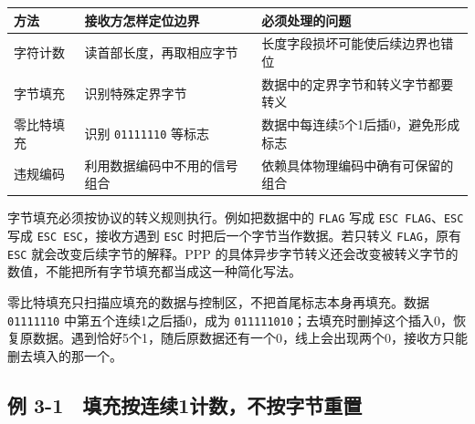 \begin{wideblock}

\par\medskip\noindent\begin{minipage}{\linewidth}\fontsize{9.3}{12}\selectfont\begin{tabularx}{\linewidth}{@{}YYY@{}}
\toprule\noalign{}
\begin{minipage}[b]{\linewidth}\raggedright
方法
\end{minipage} & \begin{minipage}[b]{\linewidth}\raggedright
接收方怎样定位边界
\end{minipage} & \begin{minipage}[b]{\linewidth}\raggedright
必须处理的问题
\end{minipage} \\
\midrule\noalign{}


字符计数 & 读首部长度，再取相应字节 & 长度字段损坏可能使后续边界也错位 \\
字节填充 & 识别特殊定界字节 & 数据中的定界字节和转义字节都要转义 \\
零比特填充 & 识别 \texttt{01111110} 等标志 & 数据中每连续5个1后插0，避免形成标志 \\
违规编码 & 利用数据编码中不用的信号组合 & 依赖具体物理编码中确有可保留的组合 \\
\bottomrule\end{tabularx}
\end{minipage}\par\medskip

\end{wideblock}

字节填充必须按协议的转义规则执行。例如把数据中的 \texttt{FLAG} 写成 \texttt{ESC FLAG}、\texttt{ESC} 写成 \texttt{ESC ESC}，接收方遇到 \texttt{ESC} 时把后一个字节当作数据。若只转义 \texttt{FLAG}，原有 \texttt{ESC} 就会改变后续字节的解释。PPP 的具体异步字节转义还会改变被转义字节的数值，不能把所有字节填充都当成这一种简化写法。

零比特填充只扫描应填充的数据与控制区，不把首尾标志本身再填充。数据 \texttt{01111110} 中第五个连续1之后插0，成为 \texttt{011111010}；去填充时删掉这个插入0，恢复原数据。遇到恰好5个1，随后原数据还有一个0，线上会出现两个0，接收方只能删去填入的那一个。

\subsection{例 3-1　填充按连续1计数，不按字节重置}\label{CN03-ex1}

